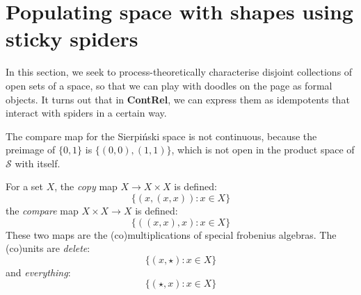 \section{Populating space with shapes using sticky spiders}\label{sec:stickyspider}


In this section, we seek to process-theoretically characterise disjoint collections of open sets of a space, so that we can play with doodles on the page as formal objects. It turns out that in \textbf{ContRel}, we can express them as idempotents that interact with spiders in a certain way.

\begin{example}\label{ex:compnotspider}
The compare map for the Sierpi\'{n}ski space is not continuous, because the preimage of $\{0,1\}$ is $\{(0,0),(1,1)\}$, which is not open in the product space of $\mathcal{S}$ with itself.
\end{example}

\begin{rem}
For a set $X$, the \emph{copy} map $X \rightarrow X \times X$ is defined:
\[\{(x,(x,x)) : x \in X \}\]
the \emph{compare} map $X \times X \rightarrow X$ is defined:
\[\{((x,x),x) : x \in X \}\]
These two maps are the (co)multiplications of special frobenius algebras. The (co)units are \emph{delete}:
\[\{(x,\star) : x \in X\}\]
and \emph{everything}:
\[\{(\star,x) : x \in X\}\]
\end{rem}

\newpage

